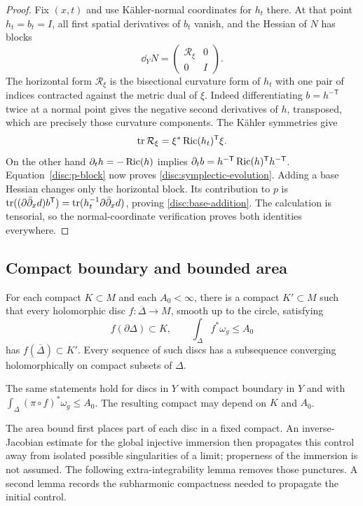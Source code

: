 \begin{proof}
Fix $(x,t)$ and use K\"ahler-normal coordinates for $h_t$ there.
At that point $h_t=b_t=I$, all first spatial derivatives of $b_t$
vanish, and the Hessian of $N$ has blocks
\[
 \dd_YN=\begin{pmatrix}\mathcal R_\xi&0\\0&I\end{pmatrix}.
\]
The horizontal form $\mathcal R_\xi$ is the bisectional curvature form
of $h_t$ with one pair of indices contracted against the metric dual
of $\xi$.  Indeed differentiating $b=h^{-\mathsf T}$ twice at a normal
point gives the negative second derivatives of $h$, transposed, which
are precisely those curvature components.  The K\"ahler symmetries give
\[
 \operatorname{tr}\mathcal R_\xi=\xi^*\operatorname{Ric}(h_t)^{\mathsf T}\xi.
\]
On the other hand $\partial_th=-\operatorname{Ric}(h)$ implies
$\partial_tb=h^{-\mathsf T}\operatorname{Ric}(h)^{\mathsf T}h^{-\mathsf T}$.
Equation~\eqref{disc:p-block} now proves
\eqref{disc:symplectic-evolution}.  Adding a base Hessian changes only
the horizontal block.  Its contribution to $p$ is
$\operatorname{tr}((\partial\bar\partial_xd)b^{\mathsf T})=\operatorname{tr}(h_t^{-1}\partial\bar\partial_xd)$, proving
\eqref{disc:base-addition}.  The calculation is tensorial, so the
normal-coordinate verification proves both identities everywhere.
\end{proof}

\subsection{Compact boundary and bounded area}

\begin{proposition}\label{prop:disc-compactness}
For each compact $K\subset M$ and each $A_0<\infty$, there is a
compact $K'\subset M$ such that every holomorphic disc
$f:\overline\Delta\to M$, smooth up to the circle, satisfying
\[
 f(\partial\Delta)\subset K,\qquad
 \int_\Delta f^*\omega_g\le A_0
\]
has $f(\overline\Delta)\subset K'$.  Every sequence of such discs
has a subsequence converging holomorphically on compact subsets of
$\Delta$.

The same statements hold for discs in $Y$ with compact boundary in
$Y$ and with $\int_\Delta(\pi\circ f)^*\omega_g\le A_0$.
The resulting compact may depend on $K$ and $A_0$.
\end{proposition}

The area bound first places part of each disc in a fixed compact.
An inverse-Jacobian estimate for the global injective immersion then
propagates this control away from isolated possible singularities of a
limit; properness of the immersion is not assumed.  The following
extra-integrability lemma removes those punctures.  A second lemma
records the subharmonic compactness needed to propagate the initial
control.

